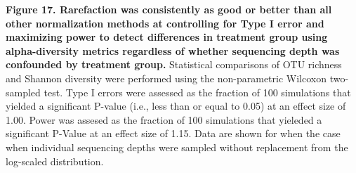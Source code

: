 \documentclass[
]{article}
\begin{document}
\textbf{Figure 17. Rarefaction was consistently as good or better than
all other normalization methods at controlling for Type I error and
maximizing power to detect differences in treatment group using
alpha-diversity metrics regardless of whether sequencing depth was
confounded by treatment group.} Statistical comparisons of OTU richness
and Shannon diversity were performed using the non-parametric Wilcoxon
two-sampled test. Type I errors were assessed as the fraction of 100
simulations that yielded a significant P-value (i.e., less than or equal
to 0.05) at an effect size of 1.00. Power was assesed as the fraction of
100 simulations that yieleded a significant P-Value at an effect size of
1.15. Data are shown for when the case when individual sequencing depths
were sampled without replacement from the log-scaled distribution.
\end{document}
